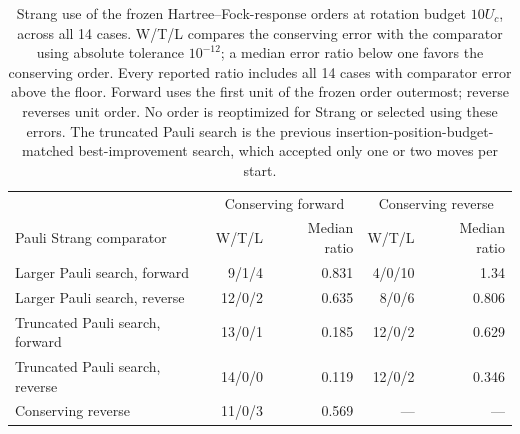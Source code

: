 \begin{table}[htbp]
\centering
\small
\begin{tabular}{lrrrr}
\toprule
 & \multicolumn{2}{c}{Conserving forward} & \multicolumn{2}{c}{Conserving reverse} \\
Pauli Strang comparator & W/T/L & Median ratio & W/T/L & Median ratio \\
\midrule
Larger Pauli search, forward & 9/1/4 & 0.831 & 4/0/10 & 1.34 \\
Larger Pauli search, reverse & 12/0/2 & 0.635 & 8/0/6 & 0.806 \\
Truncated Pauli search, forward & 13/0/1 & 0.185 & 12/0/2 & 0.629 \\
Truncated Pauli search, reverse & 14/0/0 & 0.119 & 12/0/2 & 0.346 \\
Conserving reverse & 11/0/3 & 0.569 & --- & --- \\
\bottomrule
\end{tabular}
\caption{Strang use of the frozen Hartree--Fock-response orders at rotation budget $10U_c$, across all 14 cases. W/T/L compares the conserving error with the comparator using absolute tolerance $10^{-12}$; a median error ratio below one favors the conserving order. Every reported ratio includes all 14 cases with comparator error above the floor. Forward uses the first unit of the frozen order outermost; reverse reverses unit order. No order is reoptimized for Strang or selected using these errors. The truncated Pauli search is the previous insertion-position-budget-matched best-improvement search, which accepted only one or two moves per start.}
\label{tab:strang-pauli-response-controls}
\end{table}
